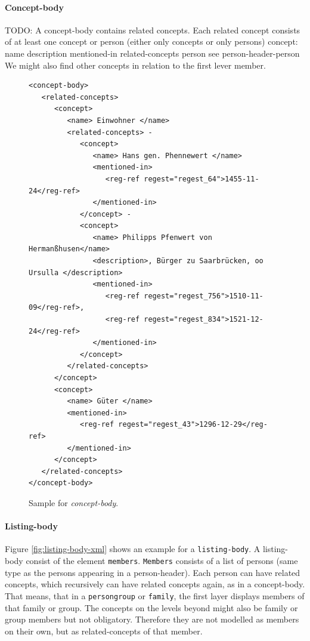 \paragraph{Concept-body}
TODO: A concept-body contains related concepts. Each related concept consists of at least one concept or person (either only concepts or only persons)
concept:
name
description
mentioned-in
related-concepts
person
see person-header-person
We might also find other concepts in relation to the first lever member.
\begin{figure}[H]
\begin{verbatim}
<concept-body>
   <related-concepts>
      <concept>
         <name> Einwohner </name>
         <related-concepts> -
            <concept>
               <name> Hans gen. Phennewert </name>
               <mentioned-in>
                  <reg-ref regest="regest_64">1455-11-24</reg-ref>
               </mentioned-in>
            </concept> -
            <concept>
               <name> Philipps Pfenwert von Hermanßhusen</name>
               <description>, Bürger zu Saarbrücken, oo Ursulla </description>
               <mentioned-in>
                  <reg-ref regest="regest_756">1510-11-09</reg-ref>, 
                  <reg-ref regest="regest_834">1521-12-24</reg-ref>
               </mentioned-in>
            </concept>
         </related-concepts>
      </concept>
      <concept>
         <name> Güter </name>
         <mentioned-in>
            <reg-ref regest="regest_43">1296-12-29</reg-ref>
         </mentioned-in>
      </concept>
   </related-concepts>
</concept-body>
\end{verbatim}
\label{fig:concept-body-xml}
\caption{Sample for \textit{concept-body}.}
\end{figure}

\paragraph{Listing-body}
Figure \ref{fig:listing-body-xml} shows an example for a \texttt{listing-body}. A listing-body consist of the element \texttt{members}. \texttt{Members} consists of a list of persons (same type as the persons appearing in a person-header). Each person can have related concepts, which recursively can have related concepts again, as in a concept-body.
That means, that in a \texttt{persongroup} or \texttt{family}, the first layer displays members of that family or group. The concepts on the levels beyond might also be family or group members but not obligatory. Therefore they are not modelled as members on their own, but as related-concepts of that member.

